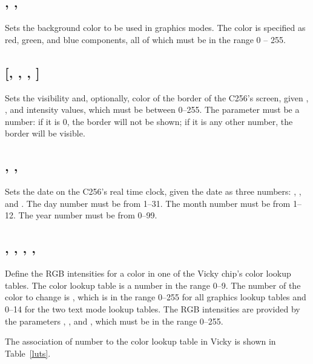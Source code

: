 \documentclass{report}
\begin{document}
    \subsection*{ , , }

    Sets the background color to be used in graphics modes.
    The color is specified as red, green, and blue components,
    all of which must be in the range 0 -- 255.

    \subsection*{  [, , ,  ]}

    Sets the visibility and, optionally, color of the border of the C256's screen, given
    , , and  intensity values, which must be
    between 0--255.
    The parameter  must be a number: if it is 0, the border
    will not be shown; if it is any other number, the border will be visible.

    \subsection*{ , , }

    Sets the date on the C256's real time clock, given the date as three numbers:
    , , and .
    The day number must be from 1--31.
    The month number must be from 1--12.
    The year number must be from 0--99.

    \subsection*{ , , , , }

    Define the RGB intensities for a color in one of the Vicky chip's color lookup tables.
    The color lookup table is a number  in the range 0--9.
    The number of the color to change is , which is in the range 0--255 for all graphics lookup tables
    and 0--14 for the two text mode lookup tables.
    The RGB intensities are provided by the parameters , , and , which 
    must be in the range 0--255.

    The association of  number to the color lookup table in Vicky
    is shown in Table~\ref{luts}.
\end{document}
